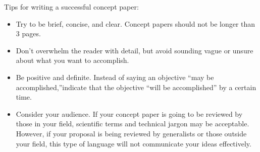 \documentclass[11pt]{article}
\begin{document}
    	\newpage
      \LARGE {Tips for writing a successful concept paper:}
       \begin{itemize}
       	\item Try to be brief, concise, and clear. Concept papers should not be longer than 3 pages. 
       	\item Don’t overwhelm the reader with detail, but avoid sounding vague or unsure about what you want to accomplish. 
       	\item Be positive and definite. Instead of saying an objective “may be accomplished,”indicate that the objective “will be accomplished” by a certain time. 
       	\item Consider your audience. If your concept paper is going to be reviewed by those in your field, scientific terms and technical jargon may be acceptable. However, if your proposal is being reviewed by generalists or those outside your field, this type of language will not communicate your ideas effectively.
       \end{itemize}
       	
       
       
\end{document}
